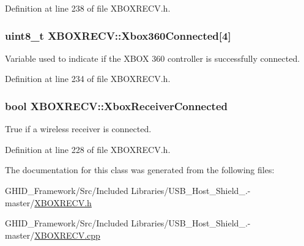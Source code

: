 \-Definition at line 238 of file \-X\-B\-O\-X\-R\-E\-C\-V.\-h.

\hypertarget{class_x_b_o_x_r_e_c_v_ac07faada38e159f1e7831d90863ebe3a}{
\subsubsection[{\-Xbox360\-Connected}]{\setlength{\rightskip}{0pt plus 5cm}uint8\-\_\-t {\bf \-X\-B\-O\-X\-R\-E\-C\-V\-::\-Xbox360\-Connected}\mbox{[}4\mbox{]}}}\label{class_x_b_o_x_r_e_c_v_ac07faada38e159f1e7831d90863ebe3a}
\-Variable used to indicate if the \-X\-B\-O\-X 360 controller is successfully connected. 

\-Definition at line 234 of file \-X\-B\-O\-X\-R\-E\-C\-V.\-h.

\hypertarget{class_x_b_o_x_r_e_c_v_a5ff16bba78f05af3023f395a342b625c}{
\subsubsection[{\-Xbox\-Receiver\-Connected}]{\setlength{\rightskip}{0pt plus 5cm}bool {\bf \-X\-B\-O\-X\-R\-E\-C\-V\-::\-Xbox\-Receiver\-Connected}}}\label{class_x_b_o_x_r_e_c_v_a5ff16bba78f05af3023f395a342b625c}
\-True if a wireless receiver is connected. 

\-Definition at line 228 of file \-X\-B\-O\-X\-R\-E\-C\-V.\-h.



\-The documentation for this class was generated from the following files\-:\begin{DoxyCompactItemize}
\item 
\-G\-H\-I\-D\-\_\-\-Framework/\-Src/\-Included Libraries/\-U\-S\-B\-\_\-\-Host\-\_\-\-Shield\-\_.-\/master/\hyperlink{_x_b_o_x_r_e_c_v_8h}{\-X\-B\-O\-X\-R\-E\-C\-V.\-h}\item 
\-G\-H\-I\-D\-\_\-\-Framework/\-Src/\-Included Libraries/\-U\-S\-B\-\_\-\-Host\-\_\-\-Shield\-\_.-\/master/\hyperlink{_x_b_o_x_r_e_c_v_8cpp}{\-X\-B\-O\-X\-R\-E\-C\-V.\-cpp}\end{DoxyCompactItemize}
